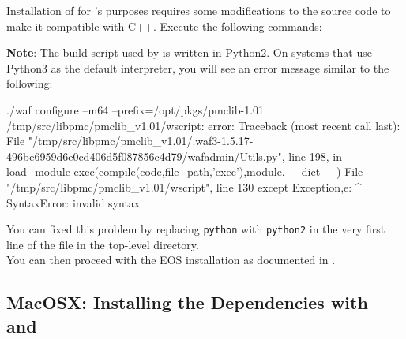 Installation of  for \EOS's purposes requires some modifications
to the source code to make it compatible with C++. Execute the following
commands:

\textbf{Note}: The  build script used by  is written in Python2. On
systems that use Python3 as the default interpreter, you will see an error message similar
to the following:
\begin{file}
./waf configure --m64 --prefix=/opt/pkgs/pmclib-1.01
/tmp/src/libpmc/pmclib_v1.01/wscript: error: Traceback (most recent call last):
  File "/tmp/src/libpmc/pmclib_v1.01/.waf3-1.5.17-496be6959d6e0cd406d5f087856c4d79/wafadmin/Utils.py", line 198, in load_module
    exec(compile(code,file_path,'exec'),module.__dict__)
  File "/tmp/src/libpmc/pmclib_v1.01/wscript", line 130
    except Exception,e:
                    ^
SyntaxError: invalid syntax
\end{file}
You can fixed this problem by replacing \texttt{python} with \texttt{python2} in the very first
line of the file \filename{waf} in the top-level  directory.\\

You can then proceed with the EOS installation as documented in \refsec{inst:EOS}.

\subsection{MacOSX: Installing the Dependencies with  and }

